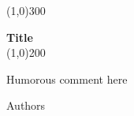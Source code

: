 \begin{titlepage}
	\vspace*{\fill}
	\begin{center}
		\color{gray}\line(1,0){300} \\
		\color{black}
		\vspace{1cm}

		\huge{\bfseries Title} \\
		[0.15in]
		\color{gray}\line(1,0){200} \\
		\color{black}

		\vspace{0.5cm}
		\begin{minipage}{8cm}
			\begin{center}
				\large{Humorous comment here}
			\end{center}
		\end{minipage}	
	\end{center}
	\vspace*{\fill}
	\vspace{3cm}
	
	\begin{flushright}
		Authors
	\end{flushright}
\end{titlepage}

\tableofcontents
{}
\thispagestyle{empty}
\clearpage
\setcounter{page}{1}


